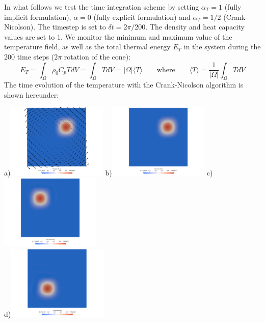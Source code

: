 In what follows we test the time integration scheme by setting $\alpha_T=1$ (fully implicit formulation), $\alpha=0$ (fully explicit formulation) and $\alpha_T=1/2$ (Crank-Nicolson).  
The timestep is set to $\delta t=2\pi/200$. The density and heat capacity values are set to 1. 
We monitor the minimum and maximum value of the temperature field, as well as the total thermal energy $E_T$ in the system during the 200 time steps ($2\pi$ rotation of the cone):
\[
E_T=\int_\Omega \rho_0 C_p T dV = \int_\Omega T dV = |\Omega| \langle T \rangle 
\qquad
\text{where}
\qquad
\langle T \rangle = \frac{1}{|\Omega|} \int_\Omega T dV
\]
The time evolution of the temperature with the Crank-Nicolson algorithm is shown hereunder:
\begin{center}
a)\includegraphics[width=4.8cm]{python_codes/fieldstone_43/images/crni/velfield}
b)\includegraphics[width=4.8cm]{python_codes/fieldstone_43/images/crni/crnitemp0000}
c)\includegraphics[width=4.8cm]{python_codes/fieldstone_43/images/crni/crnitemp0050}\\
d)\includegraphics[width=4.8cm]{python_codes/fieldstone_43/images/crni/crnitemp0100}

\end{center}
